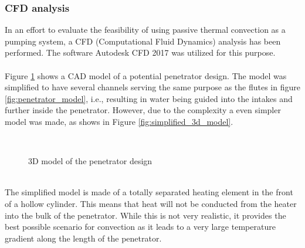 \subsubsection{CFD analysis}
In an effort to evaluate the feasibility of using passive thermal convection as a pumping system, a CFD (Computational Fluid Dynamics) analysis has been performed. The software Autodesk CFD 2017 was utilized for this purpose. 
\\
\\
Figure \ref{fig:3d_model} shows a CAD model of a potential penetrator design. The model was simplified to have several channels serving the same purpose as the flutes in figure \ref{fig:penetrator_model}, i.e., resulting in water being guided into the intakes and further inside the penetrator. However, due to the complexity a even simpler model was made, as shows in Figure \ref{fig:simplified_3d_model}. 
\\
\begin{figure}[htb]
	\centering
	\\
	\caption{3D model of the penetrator design}
	\label{fig:3d_model}
\end{figure}
\\
The simplified model is made of a totally separated heating element in the front of a hollow cylinder. This means that heat will not be conducted from the heater into the bulk of the penetrator. While this is not very realistic, it provides the best possible scenario for convection as it leads to a very large temperature gradient along the length of the penetrator.
